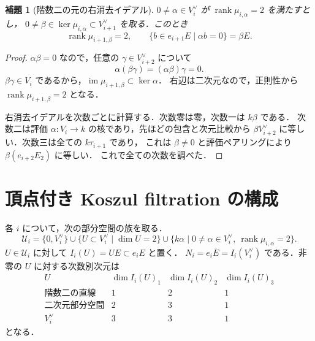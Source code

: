 \documentclass[a4paper,11pt]{ltjsarticle}
\newtheorem{lemma}[theorem]{補題}
\theoremstyle{definition}
\DeclareMathOperator{\rank}{rank}
\DeclareMathOperator{\im}{im}
\newcommand{\dual}{^{\vee}}
\newcommand{\barE}{\overline E}
\newcommand{\cU}{\mathcal U}
\begin{document}
\begin{lemma}[階数二の元の右消去イデアル]\label{lem:ann}
$0\ne\alpha\in V_i\dual$ が $\rank\mu_{i,\alpha}=2$ を満たすとし，
$0\ne\beta\in\ker\mu_{i,\alpha}\subset V_{i+1}\dual$ を取る．このとき
\begin{equation}\label{eq:ann}
 \rank\mu_{i+1,\beta}=2,\qquad
 \{b\in e_{i+1}E\mid\alpha b=0\}=\beta E.
\end{equation}
\end{lemma}
\begin{proof}
$\alpha\beta=0$ なので，任意の $\gamma\in V_{i+2}\dual$ について
\[
 \alpha(\beta\gamma)=(\alpha\beta)\gamma=0.
\]
$\beta\gamma\in V_i$ であるから，$\im\mu_{i+1,\beta}\subset\ker\alpha$．
右辺は二次元なので，正則性から $\rank\mu_{i+1,\beta}=2$ となる．

右消去イデアルを次数ごとに計算する．次数零は零，次数一は $k\beta$ である．
次数二は評価 $\alpha:V_i\to k$ の核であり，先ほどの包含と次元比較から
$\beta V_{i+2}\dual$ に等しい．次数三は全ての $k\tau_{i+1}$ であり，
これは $\beta\ne0$ と評価ペアリングにより $\beta(e_{i+2}E_2)$ に等しい．
これで全ての次数を調べた．
\end{proof}

\section{頂点付き Koszul filtration の構成}
各 $i$ について，次の部分空間の族を取る．
\begin{equation}\label{eq:admissible}
 \cU_i=\{0,V_i\dual\}\cup
 \{U\subset V_i\dual\mid\dim U=2\}\cup
 \{k\alpha\mid0\ne\alpha\in V_i\dual,\ \rank\mu_{i,\alpha}=2\}.
\end{equation}
$U\in\cU_i$ に対して $I_i(U)=UE\subset e_iE$ と置く．
$N_i=e_i\barE=I_i(V_i\dual)$ である．非零の $U$ に対する次数別次元は
\[
\begin{array}{c|ccc}
 U&\dim I_i(U)_1&\dim I_i(U)_2&\dim I_i(U)_3\\\hline
 \text{階数二の直線}&1&2&1\\
 \text{二次元部分空間}&2&3&1\\
 V_i\dual&3&3&1
\end{array}
\]
となる．
\end{document}
